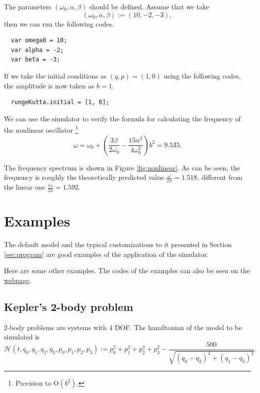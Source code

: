 \documentclass[12pt]{article}
\begin{document}
The parameters $\left(\omega_0,\alpha,\beta\right)$ should be defined.
Assume that we take
\begin{equation*}
  \left(\omega_0,\alpha,\beta\right):=\left(10,-2,-3\right),
\end{equation*}
then we can run the following codes.

\begin{verbatim}
  var omega0 = 10;
  var alpha = -2;
  var beta = -3;
\end{verbatim}

If we take the initial conditions as $\left(q,p\right)=\left(1,0\right)$ using the following codes,
the amplitude is now taken as $b=1$.

\begin{verbatim}
  rungeKutta.initial = [1, 0];
\end{verbatim}

We can use the simulator to verify the formula for calculating the frequency of the nonlinear oscillator \cite[p. 87]{landau1976mechanics}\footnote{
  Precision to $\mathrm O\!\left(b^2\right)$.
}
\begin{equation*}
  \omega=\omega_0+\left(\frac{3\beta}{2\omega_0}-\frac{15\alpha^2}{4\omega_0^3}\right)b^2=9.535.
\end{equation*}

The frequency spectrum is shown in Figure \ref{fig:nonlinear}.
As can be seen, the frequency is roughly the theoretically predicted value $\frac\omega{2\pi}=1.518$,
different from the linear one $\frac{\omega_0}{2\pi}=1.592$.

\section{Examples}
\label{sec:examples}

The default model and the typical customizations to it presented in Section \ref{sec:program}
are good examples of the application of the simulator.

Here are some other examples.
The codes of the examples can also be seen on the
\href{https://ulysseszh.github.io/rpg/mechsimul2/examples.html}{webpage}.

\subsection{Kepler's 2-body problem}

2-body problems are systems with $4$ DOF.
The hamiltonian of the model to be simulated is
\begin{equation*}
  \mathcal H\!\left(t,q_0,q_1,q_2,q_3,p_0,p_1,p_2,p_3\right):=
  p_0^2+p_1^2+p_2^3+p_3^2-\frac{500}{\sqrt{\left(q_0-q_2\right)^2+\left(q_1-q_3\right)^2}}.
\end{equation*}
\end{document}
